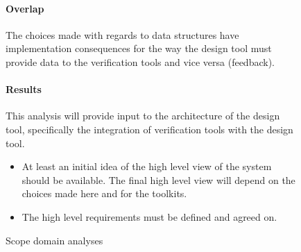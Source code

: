 \begin{figure}[!h]
{\begin{boxedminipage}[b]{.32\textwidth}
{	    \paragraph{Overlap} The choices made with regards to data structures have
	    implementation consequences for the way the design tool must provide data to the
	    verification tools and vice versa (feedback).
	    \paragraph{Results} This analysis will provide input to the architecture of the
	    design tool, specifically the integration of verification tools with the design
	    tool.
	}%
    \end{boxedminipage}
    }%

    \begin{boxedminipage}[c]{.98\textwidth}
    \begin{itemize}
	\item At least an initial idea of the high level view of the system
		should be available. The final high level
		view will depend on the choices made here and for the toolkits.
	\item The high level requirements must be defined and agreed on.
    \end{itemize}
    \end{boxedminipage}


    \caption{Scope domain analyses}
    \label{fig: domain-analysis}
\end{figure}
